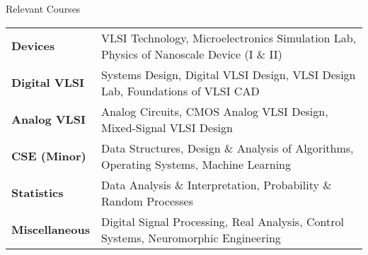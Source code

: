 \documentclass{resume} %
\begin{document}
\begin{rSection}{Relevant Courses}
\begin{tabular}{ @{} >{\bfseries}l @{\hspace{6ex}} l }
Devices &  VLSI Technology, Microelectronics Simulation Lab, Physics of Nanoscale Device (I \& II)\\ 
Digital VLSI & Systems Design, Digital VLSI Design, VLSI Design Lab, Foundations of VLSI CAD\\
Analog VLSI &  Analog Circuits, CMOS Analog VLSI Design, Mixed-Signal VLSI Design\\
CSE (Minor) & Data Structures, Design \& Analysis of Algorithms, Operating Systems, Machine Learning\\
Statistics & Data Analysis \& Interpretation,  Probability \& Random Processes
\\Miscellaneous & Digital Signal Processing, Real Analysis, Control Systems, Neuromorphic Engineering
\end{tabular}
\end{rSection}
\end{document}
